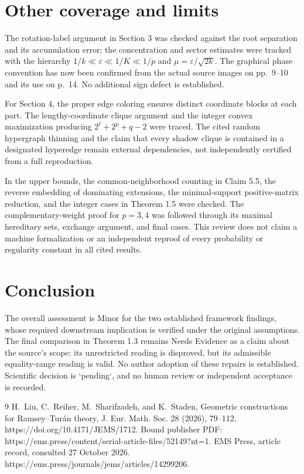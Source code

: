 \documentclass[10pt]{article}
\begin{document}
\section*{Other coverage and limits}
The rotation-label argument in Section 3 was checked against the root separation and its accumulation error; the concentration and sector estimates were tracked with the hierarchy \(1/k\ll\varepsilon\ll1/K\ll1/p\) and \(\mu=\varepsilon/\sqrt{2k}\). The graphical phase convention has now been confirmed from the actual source images on pp. 9–10 and its use on p. 14. No additional sign defect is established.\par
For Section 4, the proper edge coloring ensures distinct coordinate blocks at each part. The lengthy-coordinate clique argument and the integer convex maximization producing \(2^\ell+2^p+q-2\) were traced. The cited random hypergraph thinning and the claim that every shadow clique is contained in a designated hyperedge remain external dependencies, not independently certified from a full reproduction.\par
In the upper bounds, the common-neighborhood counting in Claim 5.5, the reverse embedding of dominating extensions, the minimal-support positive-matrix reduction, and the integer cases in Theorem 1.5 were checked. The complementary-weight proof for \(p=3,4\) was followed through its maximal hereditary sets, exchange argument, and final cases. This review does not claim a machine formalization or an independent reproof of every probability or regularity constant in all cited results.\par
\section*{Conclusion}
The overall assessment is Minor for the two established framework findings, whose required downstream implication is verified under the original assumptions. The final comparison in Theorem 1.3 remains Needs Evidence as a claim about the source’s scope: its unrestricted reading is disproved, but its admissible equality-range reading is valid. No author adoption of these repairs is established. Scientific decision is `pending`, and no human review or independent acceptance is recorded.\par
9 H. Liu, C. Reiher, M. Sharifzadeh, and K. Staden, Geometric constructions for Ramsey–Turán theory, J. Eur. Math. Soc. 28 (2026), 79–112. https://doi.org/10.4171/JEMS/1712. Bound publisher PDF: https://ems.press/content/serial-article-files/52149?nt=1. EMS Press, article record, consulted 27 October 2026. https://ems.press/journals/jems/articles/14299206.\par
\end{document}
